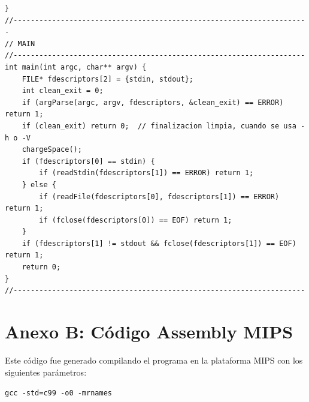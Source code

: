 \documentclass[a4paper,10pt]{article}
\begin{document}
\begin{lstlisting}
}
//---------------------------------------------------------------------
// MAIN
//--------------------------------------------------------------------
int main(int argc, char** argv) {
    FILE* fdescriptors[2] = {stdin, stdout};
    int clean_exit = 0;
    if (argParse(argc, argv, fdescriptors, &clean_exit) == ERROR) return 1;
    if (clean_exit) return 0;  // finalizacion limpia, cuando se usa -h o -V
    chargeSpace();
    if (fdescriptors[0] == stdin) {
        if (readStdin(fdescriptors[1]) == ERROR) return 1;
    } else {
        if (readFile(fdescriptors[0], fdescriptors[1]) == ERROR) return 1;
        if (fclose(fdescriptors[0]) == EOF) return 1;
    }
    if (fdescriptors[1] != stdout && fclose(fdescriptors[1]) == EOF) return 1;
    return 0;
}
//--------------------------------------------------------------------

\end{lstlisting}
    \newpage
    
\section{Anexo B: Código Assembly MIPS}
Este código fue generado compilando el programa en la plataforma MIPS con los siguientes parámetros:

\texttt{gcc -std=c99 -o0 -mrnames}
\end{document}
